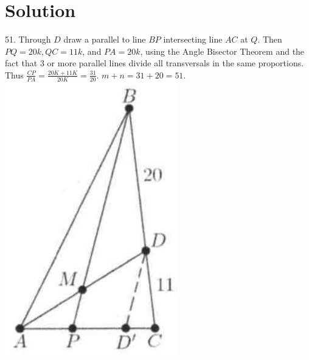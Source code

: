 \documentclass{article}
\begin{document}
\section*{Solution}
51.
Through \(D\) draw a parallel to line \(B P\) intersecting line \(A C\) at \(Q\). Then \(P Q=20 k, Q C=11 k\), and \(P A=20 k\), using the Angle Bisector Theorem and the fact that 3 or more parallel lines divide all transversals in the same proportions. Thus \(\frac{C P}{P A}=\frac{20 K+11 K}{20 K}=\frac{31}{20}\). \(m+n=31+20=51\).\\
\centering
\includegraphics[width=\textwidth]{images/070.jpg}
\end{document}
